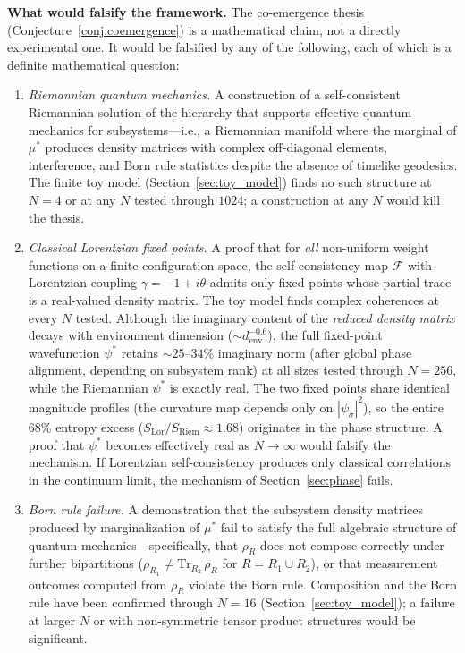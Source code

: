 \documentclass[12pt,a4paper]{article}
\theoremstyle{definition}
\theoremstyle{remark}
\begin{document}
\noindent\textbf{What would falsify the framework.} The co-emergence
thesis (Conjecture~\ref{conj:coemergence}) is a mathematical claim, not
a directly experimental one. It would be falsified by any of the
following, each of which is a definite mathematical question:
\begin{enumerate}
\item \emph{Riemannian quantum mechanics.} A construction of a
self-consistent Riemannian solution of the hierarchy that supports
effective quantum mechanics for subsystems---i.e., a Riemannian manifold
where the marginal of $\mu^*$ produces density matrices with complex
off-diagonal elements, interference, and Born rule statistics despite
the absence of timelike geodesics. The finite toy model
(Section~\ref{sec:toy_model}) finds no such structure at $N = 4$ or at
any $N$ tested through $1024$; a construction at any $N$ would kill the
thesis.

\item \emph{Classical Lorentzian fixed points.} A proof that for
\emph{all} non-uniform weight functions on a finite configuration
space, the self-consistency map $\mathcal{F}$ with Lorentzian coupling
$\gamma = -1 + i\theta$ admits only fixed points whose partial trace
is a real-valued density matrix. The toy model finds complex coherences
at every $N$ tested. Although the imaginary content of the
\emph{reduced density matrix} decays with environment dimension
($\sim d_{\mathrm{env}}^{-0.6}$), the full fixed-point wavefunction
$\psi^*$ retains $\sim 25$--$34\%$ imaginary norm (after global phase
alignment, depending on subsystem rank) at all sizes tested through
$N = 256$, while the Riemannian
$\psi^*$ is exactly real. The two fixed points share identical
magnitude profiles (the curvature map depends only on
$|\psi_\sigma|^2$), so the entire $68\%$ entropy excess
($S_{\mathrm{Lor}}/S_{\mathrm{Riem}} \approx 1.68$)
originates in the phase structure. A proof that $\psi^*$ becomes
effectively real as $N \to \infty$ would falsify the mechanism.
If Lorentzian self-consistency produces only classical correlations in
the continuum limit, the mechanism of Section~\ref{sec:phase} fails.

\item \emph{Born rule failure.} A demonstration that the subsystem
density matrices produced by marginalization of $\mu^*$ fail to satisfy
the full algebraic structure of quantum mechanics---specifically, that
$\rho_R$ does not compose correctly under further bipartitions
($\rho_{R_1} \neq \mathrm{Tr}_{R_2}\,\rho_R$ for $R = R_1 \cup R_2$),
or that measurement outcomes computed from $\rho_R$ violate the Born
rule. Composition and the Born rule have been confirmed through $N = 16$
(Section~\ref{sec:toy_model}); a failure at larger $N$ or with
non-symmetric tensor product structures would be significant.


\end{enumerate}
\end{document}
